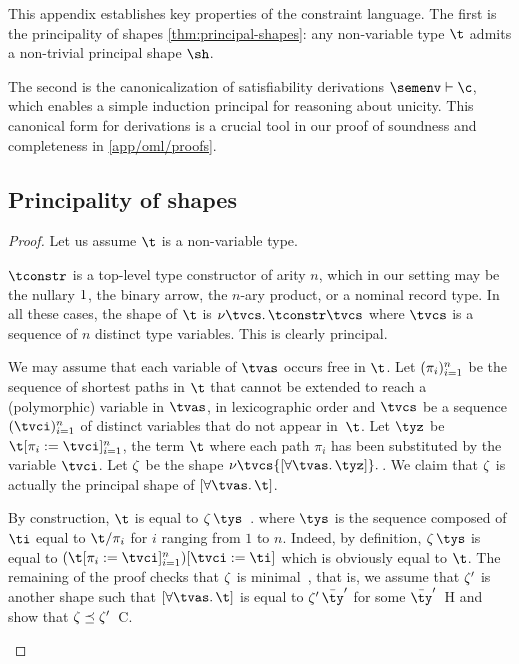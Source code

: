 \documentclass[acmsmall,screen,nonacm%
\Anonymous{,anonymous}{}%
\Final{}{,review}%
]{acmart}
\begin{document}
This appendix establishes key properties of the constraint language. The first
is the principality of shapes \cref{thm:principal-shapes}: any non-variable type
$\t$ admits a non-trivial principal shape $\sh$.

The second is the canonicalization of satisfiability derivations $\semenv \th
\c$, which enables a simple induction principal for reasoning about unicity.
This canonical form for derivations is a crucial tool in our proof of
soundness and completeness in \cref{app/oml/proofs}.

\subsection{Principality of shapes}

\principalShapesBIS*
\begin{proof}
  Let us assume $\t$ is a non-variable type.

  \begin{proofcases}

    $\tconstr$ is a top-level type constructor of arity $n$, which in
    our setting may be the nullary $1$, the binary arrow,
    the $n$-ary product, or a nominal record type. In all
    these cases, the shape of $\t$ is $\any \tvcs \tconstr \tvcs$
    where $\tvcs$ is a sequence of $n$ distinct type variables. This
    is clearly principal.


    We may assume \Wlog that each variable of $\tvs$ occurs free in
    $\t$.
    Let $(\pi_i)_{i=1}^{n}$ be the sequence of shortest paths in $\t$ that cannot be
    extended to reach a (polymorphic) variable in $\tvas$, in lexicographic
    order and $\tvcs$ be a sequence $(\tvci)\iton$ of distinct variables that do
    not appear in~$\t$.
    Let $\tyz$ be $\t \where {\pi_i \is \tvci}\iton$, \ie the term $\t$ where each
    path $\pi_i$ has been substituted by the variable $\tvci$.  Let $\zeta$ be the
    shape $\any \tvcs {\tpoly {\all \tvs \tyz}}$.
    We claim that $\zeta$ is actually the principal shape of $\tpoly {\all \tvs
    \t}$.

    \medskip
    \locallabelreset

    By construction, $\t$ is equal to $\shapp[\Sh] \tys$~.
    where $\tys$ is the sequence composed of $\ti$ equal to $\t/\pi_i$
    for $i$ ranging from $1$ to $n$.
    Indeed, by
    definition, $\shapp[\Sh] \tys$ is equal to $(\t\where {\pi_i \is \tvci}\iton)
    \where {\tvci \is \ti}$ which is obviously equal to $\t$.
    The remaining of the proof checks that $\zeta$ is minimal~, that is,
    we assume that $\zeta'$ is another shape such that $\tpoly {\all\tvs\t}$ is
    equal to $\shapp [\Shp] \typs$ for some $\typs$~\llabel H and show that $\zeta
    \preceq \zeta'$~\llabel C.


\end{proofcases}
\end{proof}
\end{document}
